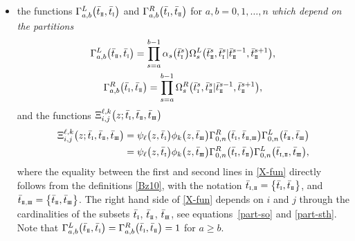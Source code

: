 \documentclass[pdftex]{sigma}
\newcommand{\so}{\scriptscriptstyle \rm I}
\newcommand{\st}{\scriptscriptstyle \rm I\hspace{-1pt}I}
\newcommand{\sth}{\scriptscriptstyle \rm I\hspace{-1pt}I\hspace{-1pt}I}
\newcommand{\bt}{{\bar t}}
\theoremstyle{definition}
\def\r#1{\eqref{#1}}
\def\Oml{\Omega^L}
\def\Omr{\Omega^R}
\def\Gml{\Gamma^L}
\def\Gmr{\Gamma^R}
\begin{document}
\begin{itemize}
\begin{gather}
\begin{cases}
\end{cases}\label{part-sth}
\\
\big|\bt^s_{\st}\big|=|\bt^s|-\big|\bt^s_{\so}\big|-\big|\bt^s_{\sth}\big| ,\label{part-st}
\end{gather}
\item the functions $\Gml_{a,b}\bigl(\bt_{\st},\bt_{\so}\bigr)$
and $\Gmr_{a,b}\bigl(\bt_{\so},\bt_{\st}\bigr)$
for $a,b=0,1,\dots,n$
\textit{which depend on the partitions}
\begin{gather*}%
\Gml_{a,b}\bigl(\bt_{\st},\bt_{\so}\bigr)
=\prod_{s=a}^{b-1}\alpha_s\bigl(\bt^s_{\so}\bigr)\Oml_s\bigl(\bt^s_{\st},\bt^s_{\so}|\bt^{s-1}_{\st},\bt^{s+1}_{\st}\bigr),\\
\Gmr_{a,b}\bigl(\bt_{\so},\bt_{\st}\bigr)
=\prod_{s=a}^{b-1}\Omr_s\bigl(\bt^s_{\so},\bt^s_{\st}|\bt^{s-1}_{\st},\bt^{s+1}_{\st}\bigr),
\end{gather*}
and the functions $\Xi^{\ell,k}_{i,j}\bigl(z;\bt_{\so},\bt_{\st},\bt_{\sth}\bigr)$
\begin{align}
\Xi^{\ell,k}_{i,j}\bigl(z;\bt_{\so},\bt_{\st},\bt_{\sth}\bigr)&=
\psi_\ell\bigl(z,\bt_{\so}\bigr) \phi_k\bigl(z,\bt_{\sth}\bigr) \Gmr_{0,n}\bigl(\bt_{\so},\bt_{{\st},{\sth}}\bigr)
\Gml_{0,n}\bigl(\bt_{\st},\bt_{{\sth}}\bigr)\nonumber\\
& =
\psi_\ell\bigl(z,\bt_{\so}\bigr) \phi_k\bigl(z,\bt_{\sth}\bigr)
\Gmr_{0,n}\bigl(\bt_{\so},\bt_{{\st}}\bigr)
\Gml_{0,n}\bigl(\bt_{{\so},{\st}},\bt_{{\sth}}\bigr) ,\label{X-fun}
\end{align}
where the equality between the first and second lines in \r{X-fun}
directly follows from the definitions \r{Bz10},
with the notation $\bt_{\so,\st} = \bigl\{\bt_{\so}, \bt_{\st}\bigr\}$, and $\bt_{\st,\sth} = \bigl\{\bt_{\st}, \bt_{\sth}\bigr\}$.
The right hand side of \eqref{X-fun} depends on $i$ and $j$ through the cardinalities of the subsets $\bt_{\so}$, $\bt_{{\st}}$, $\bt_{{\sth}}$, see equations~\eqref{part-so} and \eqref{part-sth}.
Note that $\Gml_{a,b}\bigl(\bt_{\st},\bt_{\so}\bigr)=\Gmr_{a,b}\bigl(\bt_{\so},\bt_{\st}\bigr) = 1$
for $a\geq b$.
\end{itemize}
\end{document}
